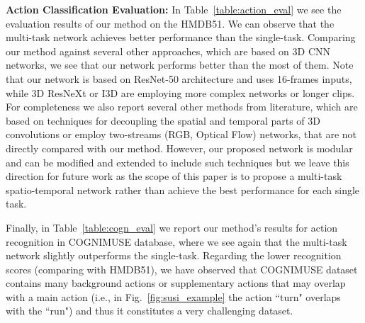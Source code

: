 \documentclass[10pt,twocolumn,letterpaper]{article}
\begin{document}
\noindent\textbf{Action Classification Evaluation:} In Table~\ref{table:action_eval} we see the evaluation results of our method on the HMDB51. We can observe that the multi-task network achieves better performance than the single-task. Comparing our method against several other approaches, which are based on 3D CNN networks, we see that our network performs better than the most of them. Note that our network is based on ResNet-50 architecture and uses 16-frames inputs, while 3D ResNeXt or I3D are employing more complex networks or longer clips. For completeness we also report several other methods from literature, which are based on techniques for decoupling the spatial and temporal parts of 3D convolutions or employ two-streams (RGB, Optical Flow) networks, that are not directly compared with our method. However, our proposed network is modular and can be modified and extended to include such techniques but we leave this direction for future work as the scope of this paper is to propose a multi-task spatio-temporal network rather than achieve the best performance for each single task. 

Finally, in Table~\ref{table:cogn_eval} we report our method's results for action recognition in \mbox{COGNIMUSE} database, where we see again that the multi-task network slightly outperforms the single-task. Regarding the lower recognition scores (comparing with HMDB51), we have observed that \mbox{COGNIMUSE} dataset contains many background actions or supplementary actions that may overlap with a main action (i.e., in Fig.~\ref{fig:susi_example} the action ``turn" overlaps with the ``run") and thus it constitutes a very challenging dataset.
\end{document}
